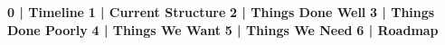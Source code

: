 \documentclass[12pt , letterpaper]{article}
\begin{document}
\begin{titlepage}
    \begin{center} \Large {}  \end{center}
\end{titlepage}

\tableofcontents \label{TableOfContents}
{\bfseries 0 | Timeline} \newline
{\bfseries 1 | Current Structure} \newline 
{\bfseries 2 | Things Done Well} \newline
{\bfseries 3 | Things Done Poorly} \newline
{\bfseries 4 | Things We Want} \newline
{\bfseries 5 | Things We Need} \newline
{\bfseries 6 | Roadmap} \newline
\end{document}
